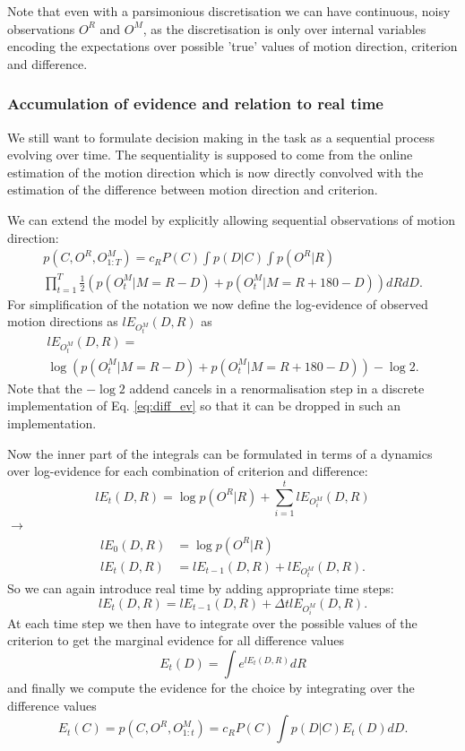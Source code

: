 \documentclass[10pt,a4paper]{article}
\begin{document}
Note that even with a parsimonious discretisation we can have continuous, noisy observations $O^R$ and $O^M$, as the discretisation is only over internal variables encoding the expectations over possible 'true' values of motion direction, criterion and difference.

\subsubsection{Accumulation of evidence and relation to real time}
We still want to formulate decision making in the task as a sequential process evolving over time. The sequentiality is supposed to come from the online estimation of the motion direction which is now directly convolved with the estimation of the difference between motion direction and criterion.

We can extend the model by explicitly allowing sequential observations of motion direction:
\begin{multline}
p(C, O^R, O^M_{1:T}) = c_R P(C) \int p(D | C) \int p(O^R | R)\\ \prod_{t=1}^T \frac{1}{2}\left( p(O^M_t | M = R - D) + p(O^M_t | M = R + 180 - D) \right) dR dD.
\end{multline}
For simplification of the notation we now define the log-evidence of observed motion directions as $lE_{O^M_t}(D, R)$ as
\begin{multline}
lE_{O^M_t}(D, R) = \\ \log \left(p(O^M_t | M = R - D) + p(O^M_t | M = R + 180 - D) \right) - \log 2.
\end{multline}
Note that the $-\log 2$ addend cancels in a renormalisation step in a discrete implementation of Eq. \eqref{eq:diff_ev} so that it can be dropped in such an implementation.

Now the inner part of the integrals can be formulated in terms of a dynamics over log-evidence for each combination of criterion and difference:
\begin{equation}
lE_t(D, R) = \log p(O^R|R) + \sum_{i=1}^t lE_{O^M_i}(D, R)
\end{equation}
$\rightarrow$
\begin{align}
lE_0(D, R) &= \log p(O^R|R)\\
lE_t(D, R) &= lE_{t-1}(D, R) + lE_{O^M_t}(D, R).
\end{align}
So we can again introduce real time by adding appropriate time steps:
\begin{equation}
lE_t(D, R) = lE_{t-1}(D, R) + \Delta t lE_{O^M_i}(D, R).
\end{equation}
At each time step we then have to integrate over the possible values of the criterion to get the marginal evidence for all difference values
\begin{equation}\label{eq:diff_ev}
E_t(D) = \int e^{lE_t(D, R)} dR
\end{equation}
and finally we compute the evidence for the choice by integrating over the difference values
\begin{equation}
E_t(C) = p(C, O^R, O^M_{1:t}) = c_R P(C) \int p(D | C) E_t(D) dD.
\end{equation}
\end{document}
